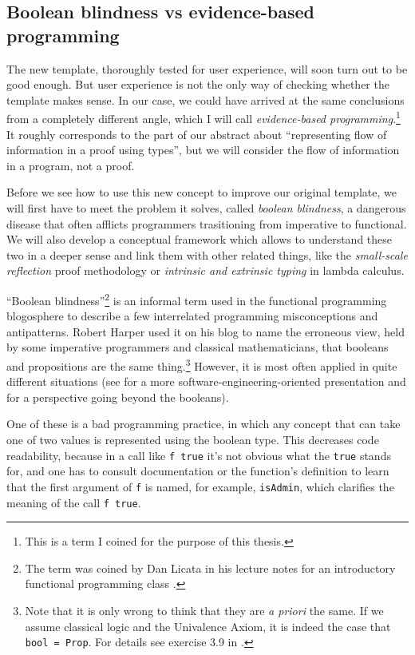 \documentclass[declaration,mgr,english,shortabstract]{iithesis}
\newcommand{\m}[1]{\texttt{#1}}
\begin{document}
\subsection{Boolean blindness vs evidence-based programming}

The new template, thoroughly tested for user experience, will soon turn out to be good enough. But user experience is not the only way of checking whether the template makes sense. In our case, we could have arrived at the same conclusions from a completely different angle, which I will call \textit{evidence-based programming}.\footnote{This is a term I coined for the purpose of this thesis.} It roughly corresponds to the part of our abstract about ``representing flow of information in a proof using types'', but we will consider the flow of information in a program, not a proof.

Before we see how to use this new concept to improve our original template, we will first have to meet the problem it solves, called \textit{boolean blindness}, a dangerous disease that often afflicts programmers trasitioning from imperative to functional. We will also develop a conceptual framework which allows to understand these two in a deeper sense and link them with other related things, like the \textit{small-scale reflection} proof methodology or \textit{intrinsic and extrinsic typing} in lambda calculus.

``Boolean blindness''\footnote{The term was coined by Dan Licata in his lecture notes for an introductory functional programming class \cite{BBLicata}.} is an informal term used in the functional programming blogosphere to describe a few interrelated programming misconceptions and antipatterns. Robert Harper used it on his blog \cite{BBHarper} to name the erroneous view, held by some imperative programmers and classical mathematicians, that booleans and propositions are the same thing.\footnote{Note that it is only wrong to think that they are \textit{a priori} the same. If we assume classical logic and the Univalence Axiom, it is indeed the case that \m{bool = Prop}. For details see exercise 3.9 in \cite{HoTTBook}.} However, it is most often applied in quite different situations (see \cite{BBFairbank} for a more software-engineering-oriented presentation and \cite{BBHXA} for a perspective going beyond the booleans).

One of these is a bad programming practice, in which any concept that can take one of two values is represented using the boolean type. This decreases code readability, because in a call like \m{f\ true} it's not obvious what the \m{true} stands for, and one has to consult documentation or the function's definition to learn that the first argument of \m{f} is named, for example, \m{isAdmin}, which clarifies the meaning of the call \m{f true}.
\end{document}
